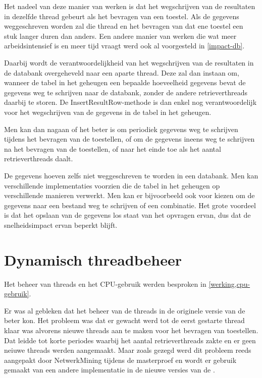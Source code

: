 Het nadeel van deze manier van werken is dat het wegschrijven van de resultaten in dezelfde thread gebeurt als het bevragen van een toestel.
Als de gegevens weggeschreven worden zal die thread en het bevragen van dat ene toestel een stuk langer duren dan anders.
Een andere manier van werken die wat meer arbeidsintensief is en meer tijd vraagt werd ook al voorgesteld in \cref{impact-db}.

Daarbij wordt de verantwoordelijkheid van het wegschrijven van de resultaten in de databank overgeheveld naar een aparte thread.
Deze zal dan instaan om, wanneer de tabel in het geheugen een bepaalde hoeveelheid gegevens bevat de gegevens weg te schrijven naar de databank,
zonder de andere retrieverthreads daarbij te storen.
De InsertResultRow-methode is dan enkel nog verantwoordelijk voor het wegschrijven van de gegevens in de tabel in het geheugen.

Men kan dan nagaan of het beter is om periodiek gegevens weg te schrijven tijdens het bevragen van de toestellen,
of om de gegevens ineens weg te schrijven na het bevragen van de toestellen, of naar het einde toe als het aantal retrieverthreads daalt.

De gegevens hoeven zelfs niet weggeschreven te worden in een databank.
Men kan verschillende implementaties voorzien die de tabel in het geheugen op verschillende manieren verwerkt.
Men kan er bijvoorbeeld ook voor kiezen om de gegevens naar een bestand weg te schrijven of een combinatie.
Het grote voordeel is dat het opslaan van de gegevens los staat van het opvragen ervan, dus dat de snelheidsimpact ervan beperkt blijft.


\section{Dynamisch threadbeheer}

Het beheer van threads en het CPU-gebruik werden besproken in \cref{werking,cpu-gebruik}.

Er was al gebleken dat het beheer van de threads in de originele versie van de \nwmretriever{} beter kon.
Het probleem was dat er gewacht werd tot de eerst gestarte thread klaar was alvorens nieuwe threads aan te maken voor het bevragen van toestellen.
Dat leidde tot korte periodes waarbij het aantal retrieverthreads zakte en er geen neiuwe threads werden aangemaakt.
Maar zoals gezegd werd dit probleem reeds aangepakt door NetwerkMining tijdens de masterproef en
wordt er gebruik gemaakt van een andere implementatie in de nieuwe versies van de \nwmretriever{}.

